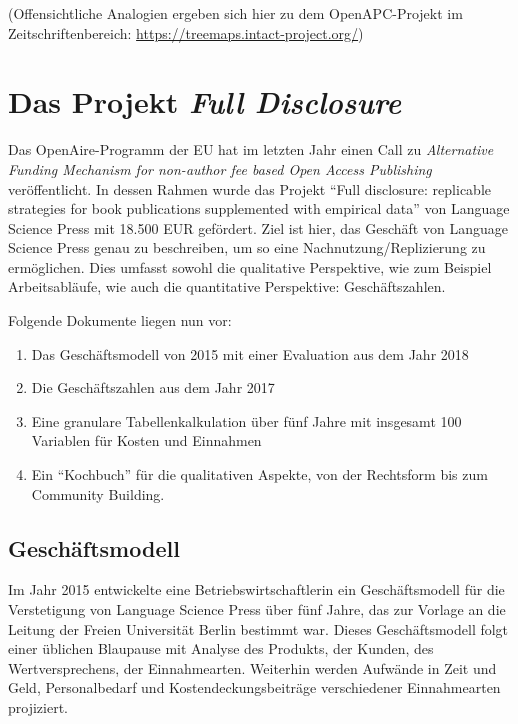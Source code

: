 \documentclass[a4paper,
fontsize=11pt,
oneside,
numbers=noperiodatend,
parskip=half-,
bibliography=totoc,
final
]{scrartcl}
\begin{document}
(Offensichtliche Analogien ergeben sich hier zu dem OpenAPC-Projekt im
Zeitschriftenbereich: \url{https://treemaps.intact-project.org/})

\hypertarget{das-projekt-full-disclosure}{%
\section{\texorpdfstring{Das Projekt \emph{Full
Disclosure}}{Das Projekt Full Disclosure}}\label{das-projekt-full-disclosure}}

Das OpenAire-Programm der EU hat im letzten Jahr einen Call zu
\emph{Alternative Funding Mechanism for non-author fee based Open Access
Publishing} veröffentlicht. In dessen Rahmen wurde das Projekt
\enquote{Full disclosure: replicable strategies for book publications
supplemented with empirical data} von Language Science Press mit 18.500
EUR gefördert. Ziel ist hier, das Geschäft von Language Science Press
genau zu beschreiben, um so eine Nachnutzung/Replizierung zu
ermöglichen. Dies umfasst sowohl die qualitative Perspektive, wie zum
Beispiel Arbeitsabläufe, wie auch die quantitative Perspektive:
Geschäftszahlen.

Folgende Dokumente liegen nun vor:

\begin{enumerate}
\def\labelenumi{\arabic{enumi}.}
\item
  Das Geschäftsmodell von 2015 mit einer Evaluation aus dem Jahr 2018
\item
  Die Geschäftszahlen aus dem Jahr 2017
\item
  Eine granulare Tabellenkalkulation über fünf Jahre mit insgesamt 100
  Variablen für Kosten und Einnahmen
\item
  Ein \enquote{Kochbuch} für die qualitativen Aspekte, von der
  Rechtsform bis zum Community Building.
\end{enumerate}

\hypertarget{geschuxe4ftsmodell}{%
\subsection{Geschäftsmodell}\label{geschuxe4ftsmodell}}

Im Jahr 2015 entwickelte eine Betriebswirtschaftlerin ein
Geschäftsmodell für die Verstetigung von Language Science Press über
fünf Jahre, das zur Vorlage an die Leitung der Freien Universität Berlin
bestimmt war. Dieses Geschäftsmodell folgt einer üblichen Blaupause mit
Analyse des Produkts, der Kunden, des Wertversprechens, der
Einnahmearten. Weiterhin werden Aufwände in Zeit und Geld,
Personalbedarf und Kostendeckungsbeiträge verschiedener Einnahmearten
projiziert.
\end{document}
